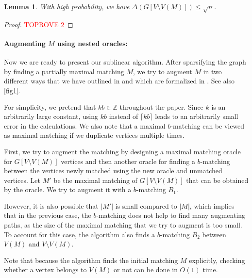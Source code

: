 \documentclass[letterpaper,11pt]{article}
\newtheorem{lemma}{Lemma}[section]
\begin{document}
\begin{lemma}\label{lem:sparsification-maximal}
    With high probability, we have $\Delta(G[V \setminus V(M)]) \leq \sqrt{n}$.
\end{lemma}
\begin{proof}\textcolor{red}{TOPROVE 2}\end{proof}


\paragraph{Augmenting $M$ using nested oracles:} Now we are ready to present our sublinear algorithm. After sparsifying the graph by finding a partially maximal matching $M$, we try to augment $M$ in two different ways that
we have outlined in 
and which
are formalized in .
See also \cref{fig1}.

For simplicity, we pretend that $kb \in \mathbb{Z}$ throughout the paper. Since $k$ is an arbitrarily large constant, using $kb$ instead of $\lceil kb \rceil$ leads to an arbitrarily small error in the calculations.
We also note that a maximal $b$-matching can be viewed as maximal matching if we duplicate vertices multiple times. 




First, we try to augment the matching by designing a maximal matching oracle for $G[V \setminus V(M)]$ vertices and then another oracle for finding a $b$-matching between the vertices newly matched using the new oracle and unmatched vertices. Let $M'$ be the maximal matching of $G[V \setminus V(M)]$ that can be obtained by the oracle. We try to augment it with a $b$-matching $B_1$.


However, it is also possible that $|M'|$ is small compared to $|M|$, which implies that in the previous case, the $b$-matching does not help to find many augmenting paths, as the size of the maximal matching that we try to augment is too small. To account for this case, the algorithm also finds a $b$-matching $B_2$ between $V(M)$ and $V \setminus V(M)$. 

Note that because the algorithm finds the initial matching $M$ explicitly, checking whether a vertex belongs to $V(M)$ or not can be done in $O(1)$ time.
\end{document}
